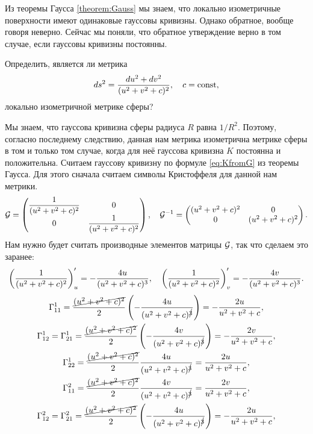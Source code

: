 Из теоремы Гаусса \ref{theorem:Gauss} мы знаем, что локально изометричные поверхности имеют одинаковые гауссовы кривизны. Однако обратное, вообще говоря неверно. Сейчас мы поняли, что обратное утверждение верно в том случае, если гауссовы кривизны постоянны.

\begin{problem}
	Определить, является ли метрика
	\[
		ds^2 = \frac{du^2 + dv^2}{(u^2 + v^2 + c)^2},\quad c = \mathrm{const},
	\]
	локально изометричной метрике сферы?
\end{problem}

\begin{solution}
	Мы знаем, что гауссова кривизна сферы радиуса $R$ равна $1 / R^2$. Поэтому, согласно последнему следствию, данная нам метрика изометрична метрике сферы в том и только том случае, когда для неё гауссова кривизна $K$ постоянна и положительна. Считаем гауссову кривизну по формуле \eqref{eq:KfromG} из теоремы Гаусса. Для этого сначала считаем символы Кристоффеля для данной нам метрики.
	\[
		\mathcal{G} =
		\begin{pmatrix}
			\dfrac{1}{(u^2 + v^2 + c)^2} & 0\\
			0 & \dfrac{1}{(u^2 + v^2 + c)^2}
		\end{pmatrix},\quad
		\mathcal{G}^{-1} =
		\begin{pmatrix}
			(u^2 + v^2 + c)^2 & 0\\
			0 & (u^2 + v^2 + c)^2
		\end{pmatrix}.
	\]
	Нам нужно будет считать производные элементов матрицы $\mathcal{G}$, так что сделаем это заранее:
	\[
		\left(\frac{1}{(u^2 + v^2 + c)^2}\right)^\prime_{u} = -\frac{4u}{(u^2 + v^2 + c)^3},\quad
		\left(\frac{1}{(u^2 + v^2 + c)^2}\right)^\prime_{v} = -\frac{4v}{(u^2 + v^2 + c)^3}.
	\]
	\begin{gather*}
		\Gamma_{11}^1 = \frac{\cancel{(u^2 + v^2 + c)^2}}{2}\br{-\frac{4u}{(u^2 + v^2 + c)^{\cancel{3}}}} = -\frac{2u}{u^2 + v^2 + c},\\
		\Gamma_{12}^1 = \Gamma_{21}^1 = \frac{\cancel{(u^2 + v^2 + c)^2}}{2}\br{-\frac{4v}{(u^2 + v^2 + c)^{\cancel{3}}}} = -\frac{2v}{u^2 + v^2 + c},\\
		\Gamma_{22}^1 = \frac{\cancel{(u^2 + v^2 + c)^2}}{2}\frac{4u}{(u^2 + v^2 + c)^{\cancel{3}}} = \frac{2u}{u^2 + v^2 + c},\\
		\Gamma_{11}^2 = \frac{\cancel{(u^2 + v^2 + c)^2}}{2}\frac{4v}{(u^2 + v^2 + c)^{\cancel{3}}} = \frac{2v}{u^2 + v^2 + c},\\
		\Gamma_{12}^2 = \Gamma_{21}^2 = \frac{\cancel{(u^2 + v^2 + c)^2}}{2}\br{-\frac{4u}{(u^2 + v^2 + c)^{\cancel{3}}}} = -\frac{2u}{u^2 + v^2 + c},\\

\end{gather*}
\end{solution}
